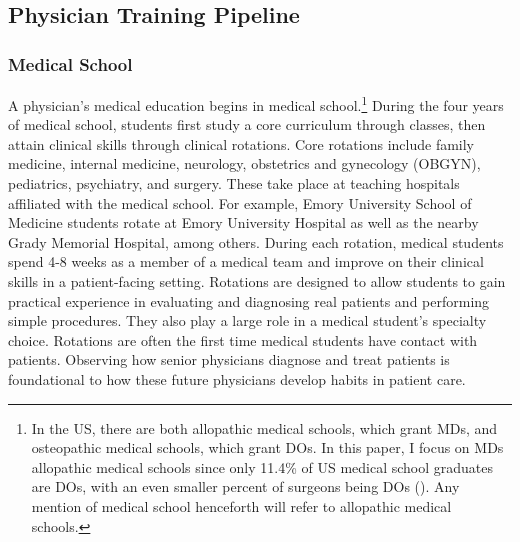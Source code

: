 
\subsection{Physician Training Pipeline}

\subsubsection{Medical School}
A physician's medical education begins in medical school.\footnote{In the US, there are both allopathic medical schools, which grant MDs, and osteopathic medical schools, which grant DOs. In this paper, I focus on MDs allopathic medical schools since only 11.4\% of US medical school graduates are DOs, with an even smaller percent of surgeons being DOs (\cite{noauthor_us_nodate}). Any mention of medical school henceforth will refer to allopathic medical schools.} During the four years of medical school, students first study a core curriculum through classes, then attain clinical skills through clinical rotations. Core rotations include family medicine, internal medicine, neurology, obstetrics and gynecology (OBGYN), pediatrics, psychiatry, and surgery. These take place at teaching hospitals affiliated with the medical school. For example, Emory University School of Medicine students rotate at Emory University Hospital as well as the nearby Grady Memorial Hospital, among others. During each rotation, medical students spend 4-8 weeks as a member of a medical team and improve on their clinical skills in a patient-facing setting. Rotations are designed to allow students to gain practical experience in evaluating and diagnosing real patients and performing simple procedures. They also play a large role in a medical student's specialty choice. Rotations are often the first time medical students have contact with patients. Observing how senior physicians diagnose and treat patients is foundational to how these future physicians develop habits in patient care. 

